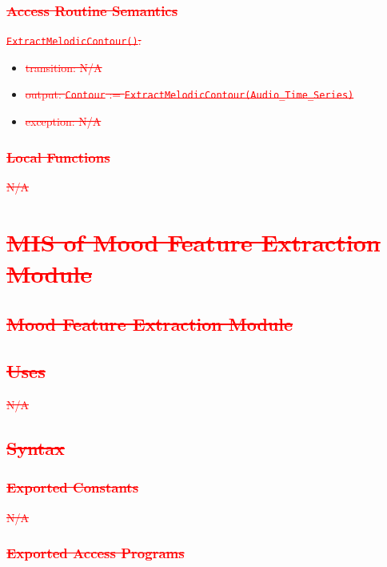 \documentclass[12pt, titlepage]{article}
\begin{document}
\subsubsection{\textcolor{red}{\sout{Access Routine Semantics}}}

\noindent \textcolor{red}{\sout{\texttt{ExtractMelodicContour()}:}}
\begin{itemize}
\item \textcolor{red}{\sout{transition: N/A}}
\item \textcolor{red}{\sout{output: \texttt{Contour} := \texttt{ExtractMelodicContour(Audio\_Time\_Series)}}}
\item \textcolor{red}{\sout{exception: N/A}}
\end{itemize}

\subsubsection{\textcolor{red}{\sout{Local Functions}}}
\textcolor{red}{\sout{N/A}}

\section{\textcolor{red}{\sout{MIS of Mood Feature Extraction Module}}} 

\subsection{\textcolor{red}{\sout{Mood Feature Extraction Module}}}

\subsection{\textcolor{red}{\sout{Uses}}}
\textcolor{red}{\sout{N/A}}

\subsection{\textcolor{red}{\sout{Syntax}}}

\subsubsection{\textcolor{red}{\sout{Exported Constants}}}
\textcolor{red}{\sout{N/A}}

\subsubsection{\textcolor{red}{\sout{Exported Access Programs}}}
\end{document}
